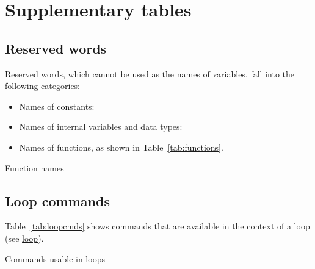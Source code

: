 \chapter{Supplementary tables}
\label{supptabs}

\section{Reserved words}
\label{sec:reserved}

Reserved words, which cannot be used as the names of variables, fall
into the following categories:

\begin{itemize}
\item Names of constants:
  

\item Names of internal variables and data types:
  

\item Names of functions, as shown in Table~\ref{tab:functions}.
\end{itemize}

\begin{table}[htbp]
\caption{Function names}
\label{tab:functions}
\begin{center}

\end{center}
\end{table}

\section{Loop commands}
\label{sec:loopcmds}

Table~\ref{tab:loopcmds} shows commands that are available in the
context of a loop (see \hyperlink{cmd-loop}{loop}).

\begin{table}[htbp]
\caption{Commands usable in loops}
\label{tab:loopcmds}
\begin{center}

\end{center}
\end{table}
